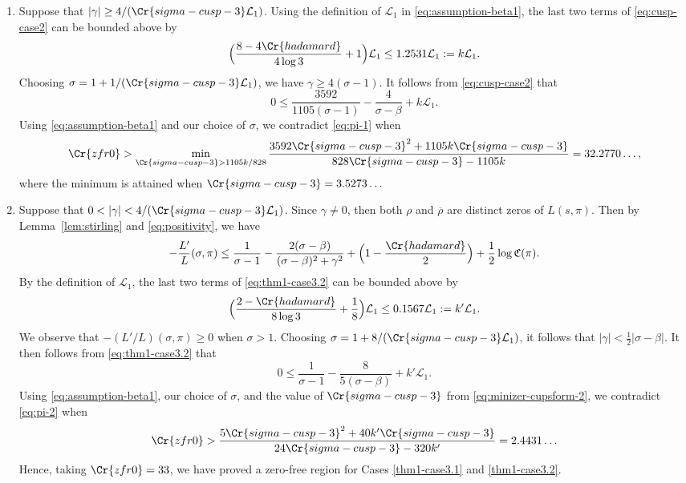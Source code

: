 \documentclass[12pt,reqno]{amsart}
\theoremstyle{remark}
\numberwithin{equation}{section}
\begin{document}
    \begin{enumerate}[ leftmargin=1cm]
        \item\label{thm1-case3.1}  Suppose that
        $|\gamma| \ge {4}/({\Cr{sigma-cusp-3}\mathcal{L}_1})$. 
        Using the definition of $\mathcal{L}_1$ in \eqref{eq:assumption-beta1}, the last two terms of \eqref{eq:cusp-case2} can be bounded above by
    \[
    \Big(\frac{8-4\Cr{hadamard}}{4\log 3} + 1\Big) \mathcal{L}_1 \le 1.2531\mathcal{L}_1 := k\mathcal{L}_1.  
    \]
    Choosing $\sigma = 1 + {1}/({\Cr{sigma-cusp-3}\mathcal{L}_1})$, we have $\gamma \ge 4(\sigma-1)$. It follows from \eqref{eq:cusp-case2} that
    \begin{equation}\label{eq:pi-1}
        0 \le \frac{3592}{1105(\sigma-1)} -\frac{4}{\sigma-\beta}
        +  k\mathcal{L}_1.
    \end{equation}
    Using \eqref{eq:assumption-beta1} and our choice of $\sigma$, we contradict \eqref{eq:pi-1} when 
    \begin{equation}\label{eq:minizer-cupsform-2}
    \Cr{zfr0} >  \min_{\Cr{sigma-cusp-3} > 1105k/828} \frac{3592\Cr{sigma-cusp-3}^2+1105k\Cr{sigma-cusp-3}}{828\Cr{sigma-cusp-3}-1105k} =  32.2770\ldots,
    \end{equation}
    where the minimum is attained when $\Cr{sigma-cusp-3} = 3.5273\ldots$
    
    \item\label{thm1-case3.2} Suppose that $0 < |\gamma| < {4}/({\Cr{sigma-cusp-3}\mathcal{L}_1})$. Since $\gamma \neq 0$, then both $\rho$ and $\overline{\rho}$ are  distinct zeros of $L(s,\pi)$. Then by Lemma~\ref{lem:stirling} and  \eqref{eq:positivity}, we have
    \begin{equation}\label{eq:thm1-case3.2}
        -\frac{L'}{L}(\sigma, \pi) \le \frac{1}{\sigma-1} - \frac{2(\sigma-\beta)}{(\sigma-\beta)^2+\gamma^2} + \Big(1-\frac{\Cr{hadamard}}{2}\Big)+ \frac{1}{2}\log \mathfrak{C}(\pi).
    \end{equation}
        By the definition of $\mathcal{L}_1$, the last two terms of \eqref{eq:thm1-case3.2} can be bounded above by
        \[
        \Big(\frac{2-\Cr{hadamard}}{8\log 3} + \frac{1}{8}\Big) \mathcal{L}_1 \le 0.1567\mathcal{L}_1 := k'\mathcal{L}_1.  
        \]
         We observe that  $-(L'/L)(\sigma, \pi) \ge 0$ when $\sigma > 1$. Choosing $\sigma = 1 + {8}/({\Cr{sigma-cusp-3}\mathcal{L}_1})$, it follows that  $|\gamma| < \frac{1}{2}|\sigma-\beta|$. It then follows from \eqref{eq:thm1-case3.2} that
        \begin{equation}\label{eq:pi-2}
         0 \le \frac{1}{\sigma-1} -\frac{8}{5(\sigma-\beta)}
        +  k'\mathcal{L}_1.   
        \end{equation}
        Using \eqref{eq:assumption-beta1}, our choice of $\sigma$, and the value of $\Cr{sigma-cusp-3}$ from \eqref{eq:minizer-cupsform-2}, we contradict \eqref{eq:pi-2} when 
        \[
        \Cr{zfr0} > \frac{5\Cr{sigma-cusp-3}^2+40k'\Cr{sigma-cusp-3}}{24\Cr{sigma-cusp-3}-320k'} =  2.4431\ldots
        \]
        Hence, taking $\Cr{zfr0} = 33$, we have proved a zero-free region for Cases \eqref{thm1-case3.1} and \eqref{thm1-case3.2}.
    

\end{enumerate}
\end{document}
